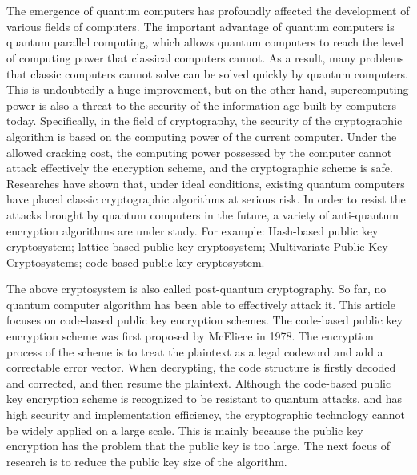 \newpage
\vspace{-1cm}
\chapter*{}
\vspace{-0.5cm}
The emergence of quantum computers has profoundly affected the development of various fields of computers. The important advantage of quantum computers is quantum parallel computing, which allows quantum computers to reach the level of computing power that classical computers cannot. As a result, many problems that classic computers cannot solve can be solved quickly by quantum computers. This is undoubtedly a huge improvement, but on the other hand, supercomputing power is also a threat to the security of the information age built by computers today. Specifically, in the field of cryptography, the security of the cryptographic algorithm is based on the computing power of the current computer. Under the allowed cracking cost, the computing power possessed by the computer cannot attack effectively the encryption scheme, and the cryptographic scheme is safe. Researches have shown that, under ideal conditions, existing quantum computers have placed classic cryptographic algorithms at serious risk. In order to resist the attacks brought by quantum computers in the future, a variety of anti-quantum encryption algorithms are under study. For example: Hash-based public key cryptosystem;  lattice-based public key cryptosystem; Multivariate Public Key Cryptosystems; code-based public key cryptosystem.

The above cryptosystem is also called post-quantum cryptography. So far, no quantum computer algorithm has been able to effectively attack it. This article focuses on code-based public key encryption schemes. The code-based public key encryption scheme was first proposed by McEliece in 1978. The encryption process of the scheme is to treat the plaintext as a legal codeword and add a correctable error vector. When decrypting, the code structure is firstly decoded and corrected, and then resume the plaintext. Although the code-based public key encryption scheme is recognized to be resistant to quantum attacks, and has high security and implementation efficiency, the cryptographic technology cannot be widely applied on a large scale. This is mainly because the public key encryption has the problem that the public key is too large. The next focus of research is to reduce the public key size of the algorithm.

